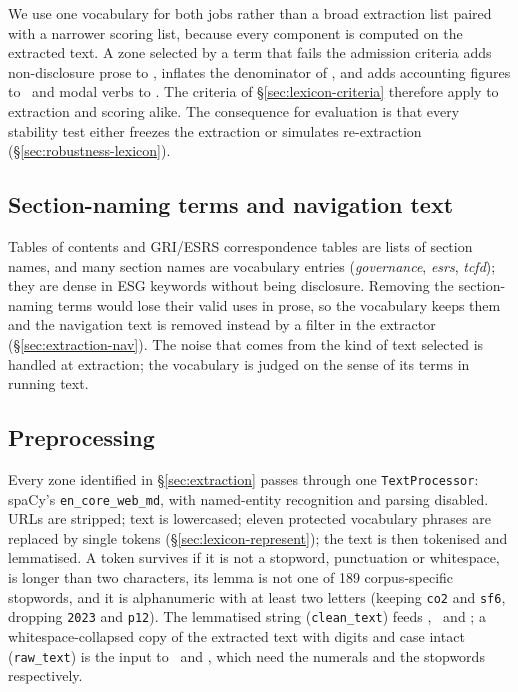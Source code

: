 We use one vocabulary for both jobs rather than a broad extraction list paired
with a narrower scoring list, because every component is computed on the
extracted text. A zone selected by a term that fails the admission criteria
adds non-disclosure prose to \SEN, inflates the denominator of \susdens, and
adds accounting figures to \QUANT\ and modal verbs to \HEDGE. The criteria of
\S\ref{sec:lexicon-criteria} therefore apply to extraction and scoring alike.
The consequence for evaluation is that every stability test either freezes the
extraction or simulates re-extraction (\S\ref{sec:robustness-lexicon}).

\subsection{Section-naming terms and navigation text}
\label{sec:lexicon-nav}

Tables of contents and GRI/ESRS correspondence tables are lists of section
names, and many section names are vocabulary entries (\emph{governance},
\emph{esrs}, \emph{tcfd}); they are dense in ESG keywords without being
disclosure. Removing the section-naming terms would lose their valid uses in
prose, so the vocabulary keeps them and the navigation text is removed instead
by a filter in the extractor (\S\ref{sec:extraction-nav}). The noise that
comes from the kind of text selected is handled at extraction; the vocabulary
is judged on the sense of its terms in running text.

\subsection{Preprocessing}

Every zone identified in \S\ref{sec:extraction} passes through one
\texttt{TextProcessor}: spaCy's \texttt{en\_core\_web\_md}, with named-entity
recognition and parsing disabled. URLs are stripped; text is lowercased;
eleven protected vocabulary phrases are replaced by single tokens
(\S\ref{sec:lexicon-represent}); the text is then tokenised and lemmatised. A
token survives if it is not a stopword, punctuation or whitespace, is longer
than two characters, its lemma is not one of 189 corpus-specific stopwords,
and it is alphanumeric with at least two letters (keeping \texttt{co2} and
\texttt{sf6}, dropping \texttt{2023} and \texttt{p12}). The lemmatised string
(\texttt{clean\_text}) feeds \SUS, \SEN\ and \BREADTH; a whitespace-collapsed
copy of the extracted text with digits and case intact (\texttt{raw\_text}) is
the input to \QUANT\ and \HEDGE, which need the numerals and the stopwords
respectively.


